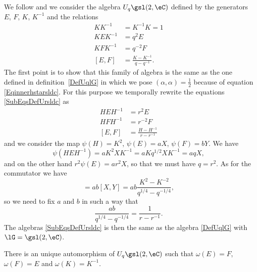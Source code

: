 We follow \cite{Kassel} and we consider the algebra \( U_q\gsl(2,\eC)\) defined by the generators \( E\), \( F\), \( K\), \( K^{-1}\) and the relations
\begin{subequations}        \label{SubEqsDefUrsldc}
	\begin{align}
		KK^{-1}  & =K^{-1}K=1                         \\
		KEK^{-1} & =q^2E          \label{EqUqslKEK}   \\
		KFK^{-1} & =q^{-2}F       \label{EqsiKFKqdGF} \\
		[E,F]    & =\frac{ K-K^{-1} }{ q-q^{-1} }.
	\end{align}
\end{subequations}
The first point is to show that this family of algebra is the same as the one defined in definition~\ref{DefUqlG} in which we pose \( (\alpha,\alpha)=\frac{ 1 }{2}\) because of equation \eqref{Eqinnerhstarsldc}. For this purpose we temporally rewrite the equations \eqref{SubEqsDefUrsldc} as
\begin{subequations}
	\begin{align}
		HEH^{-1} & =r^2E                          \\
		HFH^{-1} & =r^{-2}F                       \\
		[E,F]    & =\frac{ H-H^{-1} }{ r-r^{-1} }
	\end{align}
\end{subequations}
and we consider the map \( \psi(H)=K^2\), \( \psi(E)=aX\), \( \psi(F)=bY\). We have
\begin{equation}
	\psi(HEH^{-1})=aK^2XK^{-1}=aKq^{1/2}XK^{-1}=aqX,
\end{equation}
and on the other hand \( r^2\psi(E)=ar^2X\), so that we must have \( q=r^2\). As for the commutator we have
\begin{equation}
	[\psi(E),\psi(F)]=ab[X,Y]=ab\frac{ K^{2}-K^{-2} }{ q^{1/4}-q^{-1/4} },
\end{equation}
so we need to fix \( a\) and \( b\) in such a way that
\begin{equation}
	\frac{ ab }{ q^{1/4}-q^{-1/4} }=\frac{1}{ r-r^{-1} }.
\end{equation}
The algebras \eqref{SubEqsDefUrsldc} is then the same as the algebra \eqref{DefUqlG} with \( \lG=\gsl(2,\eC)\).

\begin{lemma}
	There is an unique automorphism of \( U_q\gsl(2,\eC)\) such that \( \omega(E)=F\), \( \omega(F)=E\) and \( \omega(K)=K^{-1}\).
\end{lemma}

